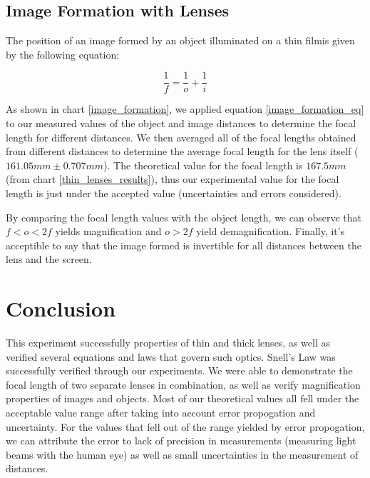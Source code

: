\documentclass{article}
\begin{document}
\subsection{Image Formation with Lenses}

The position of an image formed by an object illuminated on a thin filmis given
by the following equation:

\begin{equation}
    \label{image_formation_eq}
    \frac{1}{f} = \frac{1}{o}+\frac{1}{i}
\end{equation}

As shown in chart \ref{image_formation}, we applied equation
\ref{image_formation_eq} to our measured values of the object and image
distances to determine the focal length for different distances. We then
averaged all of the focal lengths obtained from different distances to determine
the average focal length for the lens itself ($161.05mm \pm 0.707mm$). The
theoretical value for the focal length is $167.5mm$ (from chart
\ref{thin_lenses_results}), thus our experimental value
for the focal length is just under the accepted value (uncertainties and errors
considered).

By comparing the focal length values with the object length, we can observe that
$f < o < 2f$ yields magnification and $o > 2f$ yield demagnification. Finally,
it's acceptible to say that the image formed is invertible for all distances
between the lens and the screen.

\section{Conclusion}
This experiment successfully properties of thin and thick lenses, as well as
verified several equations and laws that govern such optics. Snell's Law was
successfully verified through our experiments. We were able to demonstrate the
focal length of two separate lenses in combination, as well as verify
magnification properties of images and objects. Most of our theoretical values
all fell under the acceptable value range after taking into account error
propogation and uncertainty. For the values that fell out of the range yielded
by error propogation, we can attribute the error to lack of precision in
measurements (measuring light beams with the human eye) as well as small
uncertainties in the measurement of distances. 
\end{document}
